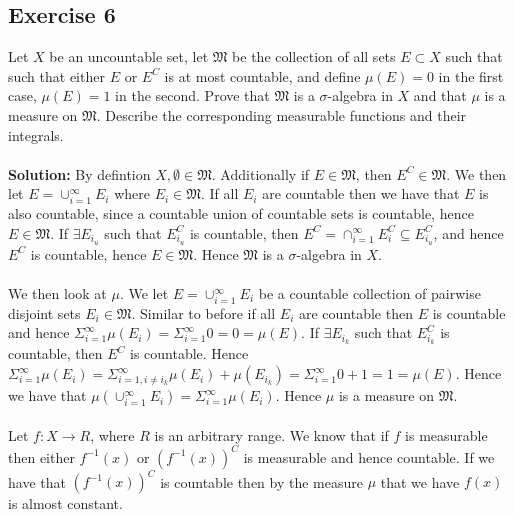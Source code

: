 \documentclass{article}
\begin{document}
\subsection*{Exercise 6}
Let $X$ be an uncountable set, let $\mathfrak{M}$ be the collection of all sets $E \subset X$ such that
such that either $E$ or $E^C$ is at most countable, and define $\mu(E) = 0$ in the first case, $\mu(E)=1$ in the
second. Prove that $\mathfrak{M}$ is a $\sigma$-algebra in $X$ and that $\mu$ is a measure on $\mathfrak{M}$. Describe
the corresponding measurable functions and their integrals.
\\\\
\textbf{Solution:}
By defintion $X,  \emptyset \in \mathfrak{M}$. Additionally if $E \in \mathfrak{M}$, then $E^C \in \mathfrak{M}$.
We then let $E = \cup_{i=1}^{\infty} E_i$ where $E_i \in \mathfrak{M}$. If all $E_i$ are countable then we have that $E$ is
also countable, since a countable union of countable sets is countable, hence $E \in \mathfrak{M}$. If $\exists E_{i_u}$ such that $E_{i_u}^C$ is countable,
then $E^C = \cap_{i=1}^{\infty}E_i^C \subseteq E_{i_u}^C$, and hence $E^C$ is countable, hence $E \in \mathfrak{M}$. Hence $\mathfrak{M}$ is a $\sigma$-algebra in $X$.
\\\\
We then look at $\mu$. We let $E = \cup_{i=1}^{\infty}E_i$ be a countable collection of pairwise disjoint sets $E_i \in \mathfrak{M}$. Similar to before
if all $E_{i}$ are countable then $E$ is countable and hence $\Sigma_{i=1}^{\infty}\mu(E_i) = \Sigma_{i=1}^{\infty} 0 = 0= \mu(E)$.
If $\exists E_{i_{k}}$ such that $E_{i_{k}}^C$ is countable, then $E^C$ is countable. Hence $\Sigma_{i=1}^{\infty}\mu(E_i) = \Sigma_{i=1, i \neq i_k}^{\infty} \mu(E_i) + \mu(E_{i_k}) = \Sigma_{i=1}^{\infty}0 + 1 = 1 = \mu(E)$.
Hence we have that $\mu(\cup_{i=1}^{\infty}E_i) = \Sigma_{i=1}^{\infty}\mu(E_i)$. Hence $\mu$ is a measure on $\mathfrak{M}$.
\\\\
Let $f: X \rightarrow R$, where $R$ is an arbitrary range. We know that if $f$ is measurable then either $f^{-1}(x)$ or $(f^{-1}(x))^C$ is measurable and hence countable.
If we have that $(f^{-1}(x))^C$ is countable then by the measure $\mu$ that we have $f(x)$ is almost constant.
\end{document}
